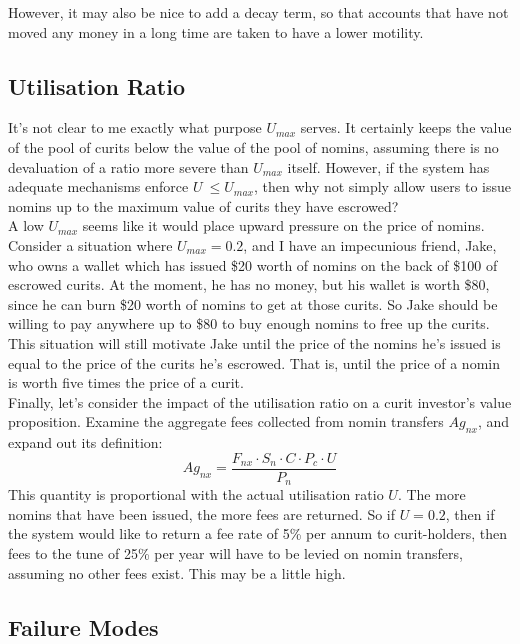 \documentclass{article}
\begin{document}
\noindent However, it may also be nice to add a decay term, so that accounts that have not moved any money in a long time
are taken to have a lower motility.


\pagebreak
\subsection{Utilisation Ratio}

It's not clear to me exactly what purpose \(U_{max}\) serves. It certainly keeps the value of the pool of
curits below the value of the pool of nomins, assuming there is no devaluation of a ratio more severe than 
\(U_{max}\) itself. However, if the system has adequate mechanisms enforce \(U\ \leq U_{max}\), then
why not simply allow users to issue nomins up to the maximum value of curits they have escrowed? \\

\noindent A low \(U_{max}\) seems like it would place upward pressure on the price of nomins.
Consider a situation where \(U_{max} = 0.2\), and I have an impecunious friend, Jake, who owns a wallet which
has issued \$20 worth of nomins on the back of \$100 of escrowed curits. At the moment, he has no
money, but his wallet is worth \$80, since he can burn \$20 worth of nomins to get at those curits.
So Jake should be willing to pay anywhere up to \$80 to buy enough nomins to free up the curits.
This situation will still motivate Jake until the price of the nomins he's issued is equal to the
price of the curits he's escrowed. That is, until the price of a nomin is worth five times the price of
a curit.\\

\noindent Finally, let's consider the impact of the utilisation ratio on a curit investor's value proposition.
Examine the aggregate fees collected from nomin transfers \(Ag_{nx}\), and expand out its definition:
\[Ag_{nx} = \frac{F_{nx} \cdot S_n \cdot C \cdot P_c \cdot U}{P_n}\]
This quantity is proportional with the actual utilisation ratio \(U\). The more nomins that have
been issued, the more fees are returned. So if \(U = 0.2\), then if the system would like to return 
a fee rate of 5\% per annum to curit-holders, then fees to the tune of 25\% per year will have to be
levied on nomin transfers, assuming no other fees exist. This may be a little high.

\pagebreak
\subsection{Failure Modes}
\end{document}
